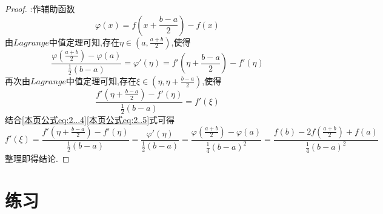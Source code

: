 \documentclass[lang=cn,newtx,10pt,scheme=chinese]{../Template/elegantbook}
\begin{document}
\begin{example}
\begin{proof}
        {\color{blue} }:作辅助函数
        \begin{equation}
            \varphi \left( x \right) =f\left( x+\frac{b-a}{2} \right) -f\left( x \right)
        \nonumber
        \end{equation}
        由$Lagrange$中值定理可知,存在$\eta \in \left( a,\frac{a+b}{2} \right)$,使得
        \begin{equation}\label{本页公式eq:2...4}
            \frac{\varphi \left( \frac{a+b}{2} \right) -\varphi \left( a \right)}{\frac{1}{2}\left( b-a \right)}=\varphi '\left( \eta \right) =f'\left( \eta +\frac{b-a}{2} \right) -f'\left( \eta \right) 
        \end{equation}
        再次由$Lagrange$中值定理可知,存在$\xi \in \left( \eta ,\eta +\frac{b-a}{2} \right)$,使得
        \begin{equation}\label{本页公式eq:2..5}
            \frac{f'\left( \eta +\frac{b-a}{2} \right) -f'\left( \eta \right)}{\frac{1}{2}\left( b-a \right)}=f'\left( \xi \right) 
        \end{equation}
        结合\eqref{本页公式eq:2...4}\eqref{本页公式eq:2..5}式可得
        \begin{equation}
            f'\left( \xi \right) =\frac{f'\left( \eta +\frac{b-a}{2} \right) -f'\left( \eta \right)}{\frac{1}{2}\left( b-a \right)}=\frac{\varphi '\left( \eta \right)}{\frac{1}{2}\left( b-a \right)}=\frac{\varphi \left( \frac{a+b}{2} \right) -\varphi \left( a \right)}{\frac{1}{4}\left( b-a \right) ^2}=\frac{f\left( b \right) -2f\left( \frac{a+b}{2} \right) +f\left( a \right)}{\frac{1}{4}\left( b-a \right) ^2}
            \nonumber
        \end{equation}
        整理即得结论.

    
\end{proof}
\end{example}

\section{练习}
\end{document}
